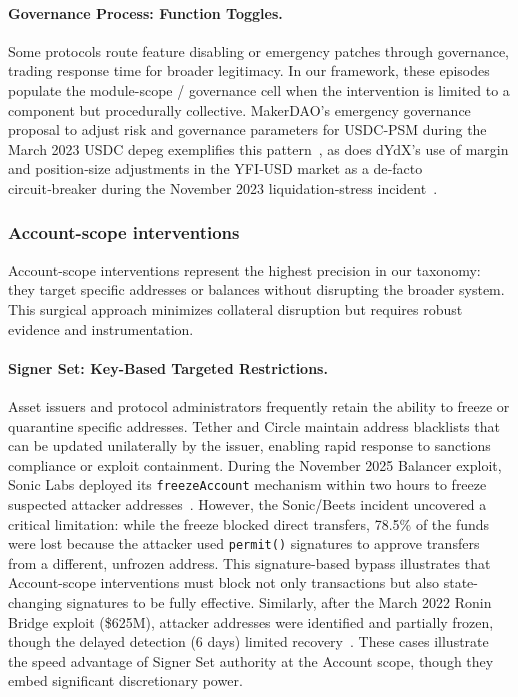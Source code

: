 \documentclass[12pt]{article}
\begin{document}
\paragraph{Governance Process: Function Toggles.}
Some protocols route feature disabling or emergency patches through governance, trading response time for broader legitimacy.
In our framework, these episodes populate the module-scope / governance cell when the intervention is limited to a component but procedurally collective.
MakerDAO's emergency governance proposal to adjust risk and governance parameters for USDC‑PSM during the March 2023 USDC depeg exemplifies this pattern~\cite{MakerDAOEmergency2023}, as does dYdX's use of margin and position‑size adjustments in the YFI‑USD market as a de‑facto circuit‑breaker during the November 2023 liquidation‑stress incident~\cite{dYdXSushiYFI}.

\subsubsection{Account-scope interventions}
\label{sec:incidents-account}

Account-scope interventions represent the highest precision in our taxonomy: they target specific addresses or balances without disrupting the broader system.
This surgical approach minimizes collateral disruption but requires robust evidence and instrumentation.

\paragraph{Signer Set: Key-Based Targeted Restrictions.}
Asset issuers and protocol administrators frequently retain the ability to freeze or quarantine specific addresses. Tether and Circle maintain address blacklists that can be updated unilaterally by the issuer, enabling rapid response to sanctions compliance or exploit containment. During the November 2025 Balancer exploit, Sonic Labs deployed its \texttt{freezeAccount} mechanism within two hours to freeze suspected attacker addresses~\cite{Sonic2025Freeze}. However, the Sonic/Beets incident uncovered a critical limitation: while the freeze blocked direct transfers, 78.5\% of the funds were lost because the attacker used \texttt{permit()} signatures to approve transfers from a different, unfrozen address. This signature-based bypass illustrates that Account-scope interventions must block not only transactions but also state-changing signatures to be fully effective. Similarly, after the March 2022 Ronin Bridge exploit (\$625M), attacker addresses were identified and partially frozen, though the delayed detection (6 days) limited recovery~\cite{Ronin2022Exploit}. These cases illustrate the speed advantage of Signer Set authority at the Account scope, though they embed significant discretionary power.
\end{document}
